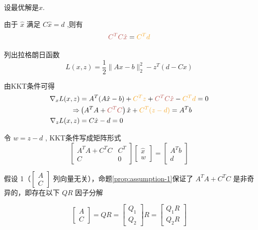 设最优解是$\hat{x}$.

由于 $ \hat{x} $ 满足 $ C \hat{x}=d $ ,则有 \begin{equation}\displaystyle \textcolor[rgb]{0.72,0.33,0.31}{C^{T} C\hat{x}} =\textcolor[rgb]{0.96,0.65,0.14}{C^{T} d}\end{equation} 

列出拉格朗日函数
\begin{equation}
L(x, z)=\frac{1}{2}\|A x-b\|_{2}^{2}-z^{T}(d-C x)
\end{equation}

由KKT条件可得
\begin{equation}\begin{aligned}
    \nabla _{x} L(x,z) & =A^{T} (A\hat{x} -b)+\textcolor[rgb]{0.96,0.65,0.14}{C^{T} z} +\textcolor[rgb]{0.72,0.33,0.31}{C^{T} C\hat{x}} -\textcolor[rgb]{0.96,0.65,0.14}{C^{T} d} =0\\
      \Rightarrow& \left( A^{T} A+\textcolor[rgb]{0.72,0.33,0.31}{C^{T} C}\right)\hat{x} +\textcolor[rgb]{0.96,0.65,0.14}{C^{T} (z-d)} =A^{T} b\\
    \nabla _{z} L(x,z) & =C\hat{x} -d=0
    \end{aligned}
\end{equation}

令 $ w=z-d $ , KKT条件写成矩阵形式
\begin{equation}
\left[\begin{array}{cc}
A^{T} A+C^{T} C & C^{T} \\
C & 0
\end{array}\right]\left[\begin{array}{l}
\hat{x} \\
w
\end{array}\right]=\left[\begin{array}{c}
A^{T} b \\
d
\end{array}\right]
\end{equation}

假设 1（$ \left[\begin{array}{l}A \\ C\end{array}\right] $ 列向量无关），命题\ref{prop:assumption-1}保证了 $ A^{T} A+C^{T} C $ 是非奇异的，即存在以下 $ Q R $ 因子分解

\begin{equation} \left[\begin{array}{l}A \\ C\end{array}\right]=Q R=\left[\begin{array}{l}Q_{1} \\ Q_{2}\end{array}\right] R=\left[\begin{array}{l}Q_{1} R \\ Q_{2} R\end{array}\right] \end{equation}

